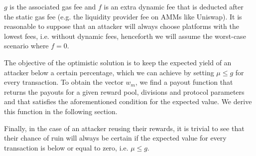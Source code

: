 $g$ is the associated gas fee and $f$ is an extra dynamic fee that is deducted after the static gas fee (e.g. the liquidity provider fee on AMMs like Uniswap). It is reasonable to suppose that an attacker will always choose platforms with the lowest fees, i.e. without dynamic fees, henceforth we will assume the worst-case scenario where $f=0$.

The objective of the optimistic solution is to keep the expected yield of an attacker below a certain percentage, which we can achieve by setting $\mu \leq g$ for every transaction. To obtain the vector $w_m$, we find a payout function that returns the payouts for a given reward pool, divisions and protocol parameters and that satisfies the aforementioned condition for the expected value. We derive this function in the following section. 

Finally, in the case of an attacker reusing their rewards, it is trivial to see that their chance of ruin will always be certain if the expected value for every transaction is below or equal to zero, i.e. $\mu \leq g$. \cite{gambler}